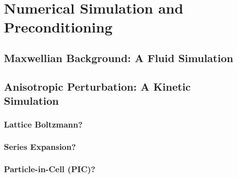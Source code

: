 \section{Numerical Simulation and Preconditioning}
    \subsection{Maxwellian Background: A Fluid Simulation}
    \subsection{Anisotropic Perturbation: A Kinetic Simulation}
        
        \subsubsection{Lattice Boltzmann?}
        \subsubsection{Series Expansion?}
        \subsubsection{Particle-in-Cell (PIC)?}